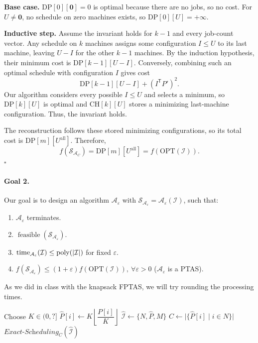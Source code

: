 \documentclass[12pt,a4paper]{article}
\begin{document}
\begin{enumerate}
\textbf{Base case.} $\mathrm{DP}[0][\mathbf{0}]=0$ is optimal because there are
no jobs, so no cost. For $U\neq\mathbf{0}$, no schedule on zero machines
exists, so $\mathrm{DP}[0][U]=+\infty$.

\textbf{Inductive step.} Assume the invariant holds for $k-1$ and every job-count
vector. Any schedule on $k$ machines assigns some configuration $I\leq U$
to its last machine, leaving $U-I$ for the other $k-1$ machines. By the
induction hypothesis, their minimum cost is $\mathrm{DP}[k-1][U-I]$.
Conversely, combining such an optimal schedule with configuration $I$
gives cost
\[
\mathrm{DP}[k-1][U-I]+(I^{\mathsf T}P')^2.
\]
Our algorithm considers every possible $I\leq U$ and selects a minimum,
so $\mathrm{DP}[k][U]$ is optimal and $\mathrm{CH}[k][U]$ stores a
minimizing last-machine configuration. Thus, the invariant holds.

The reconstruction follows these stored minimizing
configurations, so its total cost is $\mathrm{DP}[m][U^{\mathrm{all}}]$.
Therefore,
\[
f(\mathcal{S}_{\mathcal{A}_C})
=\mathrm{DP}[m][U^{\mathrm{all}}]
=f(\mathrm{OPT}(\mathcal{I})).
\]
\hfill$\square$
\end{enumerate}

\paragraph{Goal 2.}
Our goal is to design an algorithm $\mathcal{A}_{\varepsilon}$ with
$\mathcal{S}_{\mathcal{A}_{\varepsilon}}=\mathcal{A}_{\varepsilon}(\mathcal{I})$,
such that:
\begin{enumerate}
\item $\mathcal{A}_{\varepsilon}$ terminates.
\item $\operatorname{feasible}(\mathcal{S}_{\mathcal{A}_{\varepsilon}})$.
\item $\operatorname{time}_{\mathcal{A}_{\varepsilon}}(\mathcal{I})
\leq\operatorname{poly}(|\mathcal{I}|)$ for fixed $\varepsilon$.
\item $f(\mathcal{S}_{\mathcal{A}_{\varepsilon}})
\leq(1+\varepsilon)f(\mathrm{OPT}(\mathcal{I})),\ \forall\varepsilon>0$
($\mathcal{A}_{\varepsilon}$ is a PTAS).
\end{enumerate}

As we did in class with the knapsack FPTAS, we will try rounding the processing times.

\begin{algorithm}[htbp]
\caption{$\textit{PTAS-Scheduling}(\mathcal{I},\varepsilon)$}
\begin{algorithmic}
\State Choose $K\in(0,?]$
\State $\widehat{P}[i]\gets K\left\lfloor\dfrac{P[i]}{K}\right\rfloor$
\EndFor
\State $\widehat{\mathcal{I}}\gets\{N,\widehat{P},M\}$
\State $C\gets\bigl|\{\widehat{P}[i]\mid i\in N\}\bigr|$
\State \Return $\textit{Exact-Scheduling}_C(\widehat{\mathcal{I}})$
\end{algorithmic}
\end{algorithm}
\end{document}
